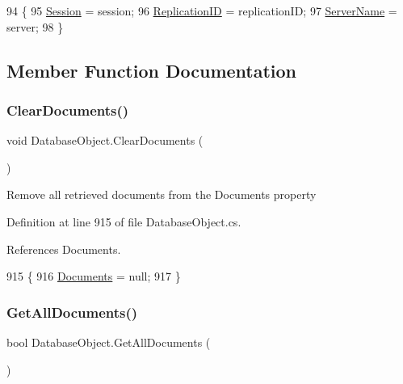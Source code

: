 \begin{DoxyCode}
94                                                                                       \{
95         \mbox{\hyperlink{class_database_object_aa8484162b7d2a7c4c9426bca13c64c07}{Session}} = session;
96         \mbox{\hyperlink{class_database_object_aaa091ee1a9a86d2d10fe2381ee2d1f4c}{ReplicationID}} = replicationID;
97         \mbox{\hyperlink{class_database_object_ad6bfcd30152f7a115ac5a1c7fbfa9fcb}{ServerName}} = server;
98     \}
\end{DoxyCode}


\subsection{Member Function Documentation}
\mbox{\label{class_database_object_af9c4789dea0a14e5a2f914758d3bc54e}} 
\subsubsection{\texorpdfstring{Clear\+Documents()}{ClearDocuments()}}
{\footnotesize\ttfamily void Database\+Object.\+Clear\+Documents (\begin{DoxyParamCaption}{ }\end{DoxyParamCaption})}



Remove all retrieved documents from the \textquotesingle{}Documents\textquotesingle{} property 



Definition at line 915 of file Database\+Object.\+cs.



References Documents.


\begin{DoxyCode}
915                                  \{
916         \mbox{\hyperlink{class_database_object_afaf1159aa427c5bcce01c4b8c6f34514}{Documents}} = null;
917     \}
\end{DoxyCode}
\mbox{\label{class_database_object_ad3010e55b2e75d0863e168fed1e279c5}} 
\subsubsection{\texorpdfstring{Get\+All\+Documents()}{GetAllDocuments()}}
{\footnotesize\ttfamily bool Database\+Object.\+Get\+All\+Documents (\begin{DoxyParamCaption}{ }\end{DoxyParamCaption})}



